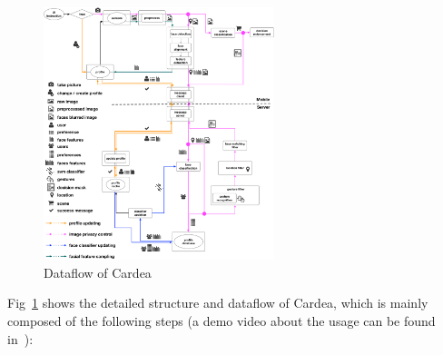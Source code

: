 \begin{figure}[!htbp]
    \centering
    \includegraphics[width=0.6\textwidth]{figure/ch4-cardeadataflow.pdf}
    \caption{Dataflow of Cardea}
    \label{fig:ch4-cardeadataflow}
\end{figure}

Fig~\ref{fig:ch4-cardeadataflow} shows the detailed structure and dataflow of Cardea, which is mainly composed of the following steps (a demo video about the usage can be found in~\cite{links:cardeavid}):

